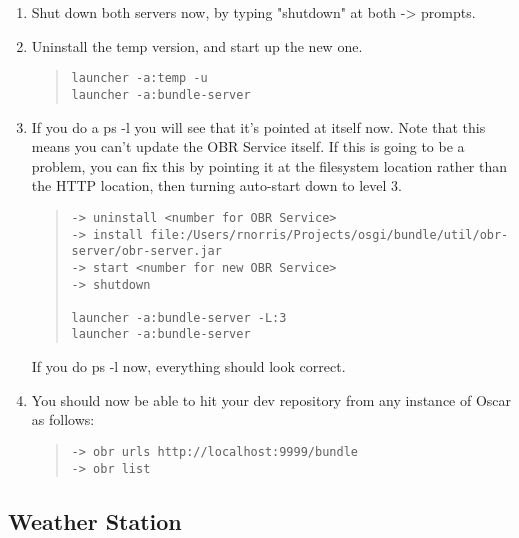 \documentclass{report}
\begin{document}
\begin{enumerate}
\item Shut down both servers now, by typing "shutdown" at both -> prompts.

\item Uninstall the temp version, and start up the new one.
\begin{quote}\begin{scriptsize}\begin{verbatim}
launcher -a:temp -u 
launcher -a:bundle-server
\end{verbatim}\end{scriptsize}\end{quote}

\item If you do a ps -l you will see that it's pointed at itself now. Note that
this means you can't update the OBR Service itself. If this is going to be a
problem, you can fix this by pointing it at the filesystem location rather than
the HTTP location, then turning auto-start down to level 3.
\begin{quote}\begin{scriptsize}\begin{verbatim}
-> uninstall <number for OBR Service> 
-> install file:/Users/rnorris/Projects/osgi/bundle/util/obr-server/obr-server.jar 
-> start <number for new OBR Service> 
-> shutdown

launcher -a:bundle-server -L:3 
launcher -a:bundle-server
\end{verbatim}\end{scriptsize}\end{quote}
If you do ps -l now, everything should look correct.

\item You should now be able to hit your dev repository from any instance of Oscar
as follows:
\begin{quote}\begin{scriptsize}\begin{verbatim}
-> obr urls http://localhost:9999/bundle 
-> obr list
\end{verbatim}\end{scriptsize}\end{quote}

\end{enumerate}


\subsection{Weather Station}
\end{document}
